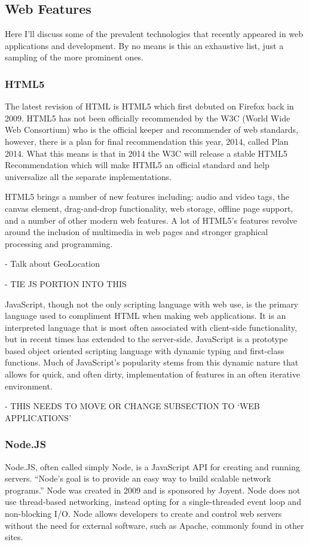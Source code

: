 \documentclass[11pt]{article}
\begin{document}
\subsection{Web Features}
Here I'll discuss some of the prevalent technologies that recently appeared in web applications and development. By no means is this an exhaustive list, just a sampling of the more prominent ones.

\subsubsection{HTML5}
The latest revision of HTML is HTML5 which first debuted on Firefox back in 2009. \cite{EvolutionOfWeb} HTML5 has not been officially recommended by the W3C (World Wide Web Consortium) who is the official keeper and recommender of web standards, however, there is a plan for final recommendation this year, 2014, called Plan 2014. \cite{Plan2014} What this means is that in 2014 the W3C will release a stable HTML5 Recommendation which will make HTML5 an official standard and help universalize all the separate implementations.

HTML5 brings a number of new features including: audio and video tags, the canvas element, drag-and-drop functionality, web storage, offline page support, and a number of other modern web features. A lot of HTML5's features revolve around the inclusion of multimedia in web pages and stronger graphical processing and programming.

- Talk about GeoLocation

- TIE JS PORTION INTO THIS

JavaScript, though not the only scripting language with web use, is the primary language used to compliment HTML when making web applications. It is an interpreted language that is most often associated with client-side functionality, but in recent times has extended to the server-side. JavaScript is a prototype based object oriented scripting language with dynamic typing and first-class functions. Much of JavaScript's popularity stems from this dynamic nature that allows for quick, and often dirty, implementation of features in an often iterative environment.


- THIS NEEDS TO MOVE OR CHANGE SUBSECTION TO `WEB APPLICATIONS'
\subsubsection{Node.JS}
Node.JS, often called simply Node, is a JavaScript API for creating and running servers. ``Node's goal is to provide an easy way to build scalable network programs.'' \cite{Node} Node was created in 2009 and is sponsored by Joyent. Node does not use thread-based networking, instead opting for a single-threaded event loop and non-blocking I/O. Node allows developers to create and control web servers without the need for external software, such as Apache, commonly found in other sites.
\end{document}
